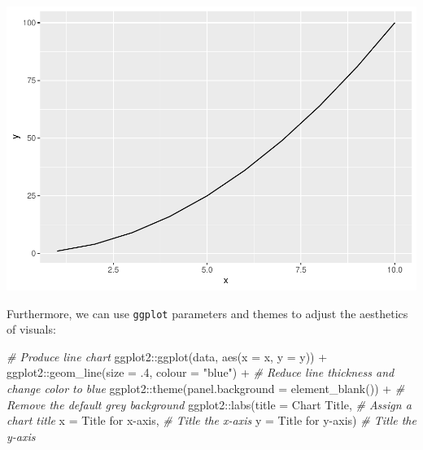 \documentclass[
]{book}
\newenvironment{Shaded}{\begin{snugshade}}{\end{snugshade}}
\newcommand{\AttributeTok}[1]{\textcolor[rgb]{0.77,0.63,0.00}{#1}}
\newcommand{\CommentTok}[1]{\textcolor[rgb]{0.56,0.35,0.01}{\textit{#1}}}
\newcommand{\DecValTok}[1]{\textcolor[rgb]{0.00,0.00,0.81}{#1}}
\newcommand{\FunctionTok}[1]{\textcolor[rgb]{0.00,0.00,0.00}{#1}}
\newcommand{\NormalTok}[1]{#1}
\newcommand{\SpecialCharTok}[1]{\textcolor[rgb]{0.00,0.00,0.00}{#1}}
\newcommand{\StringTok}[1]{\textcolor[rgb]{0.31,0.60,0.02}{#1}}
\begin{document}
\includegraphics{The_Fundamentals_of_People_Analytics_files/figure-latex/unnamed-chunk-51-1.pdf}

Furthermore, we can use \texttt{ggplot} parameters and themes to adjust the aesthetics of visuals:

\begin{Shaded}
\begin{Highlighting}[]
\CommentTok{\# Produce line chart}
\NormalTok{ggplot2}\SpecialCharTok{::}\FunctionTok{ggplot}\NormalTok{(data, }\FunctionTok{aes}\NormalTok{(}\AttributeTok{x =}\NormalTok{ x, }\AttributeTok{y =}\NormalTok{ y)) }\SpecialCharTok{+}
\NormalTok{ggplot2}\SpecialCharTok{::}\FunctionTok{geom\_line}\NormalTok{(}\AttributeTok{size =}\NormalTok{ .}\DecValTok{4}\NormalTok{, }\AttributeTok{colour =} \StringTok{"blue"}\NormalTok{) }\SpecialCharTok{+} \CommentTok{\# Reduce line thickness and change color to blue}
\NormalTok{ggplot2}\SpecialCharTok{::}\FunctionTok{theme}\NormalTok{(}\AttributeTok{panel.background =} \FunctionTok{element\_blank}\NormalTok{()) }\SpecialCharTok{+} \CommentTok{\# Remove the default grey background}
\NormalTok{ggplot2}\SpecialCharTok{::}\FunctionTok{labs}\NormalTok{(}\AttributeTok{title =} \StringTok{\textquotesingle{}Chart Title\textquotesingle{}}\NormalTok{, }\CommentTok{\# Assign a chart title}
              \AttributeTok{x =} \StringTok{\textquotesingle{}Title for x{-}axis\textquotesingle{}}\NormalTok{, }\CommentTok{\# Title the x{-}axis}
              \AttributeTok{y =} \StringTok{\textquotesingle{}Title for y{-}axis\textquotesingle{}}\NormalTok{) }\CommentTok{\# Title the y{-}axis}
\end{Highlighting}
\end{Shaded}
\end{document}
